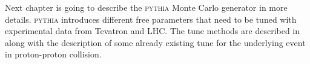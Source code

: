 Next chapter is going to describe the \textsc{pythia} Monte Carlo generator in more details. \textsc{pythia} introduces different free parameters that need to be tuned with experimental data from Tevatron and LHC. The tune methods are described in  along with the description of some already existing tune for the underlying event in proton-proton collision.










%